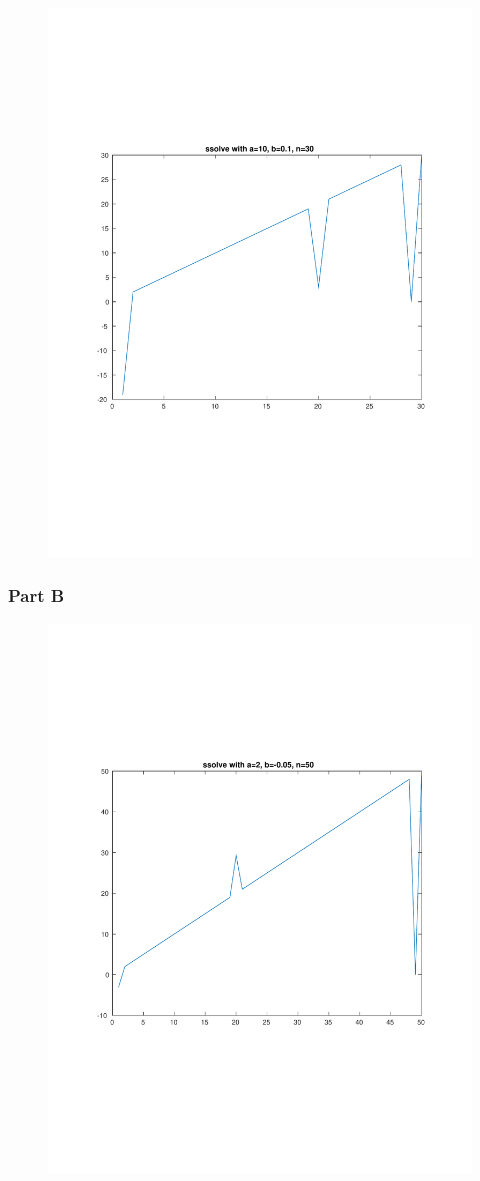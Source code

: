 \begin{figure}[h]
\centering
\includegraphics[trim = 20mm 20mm 20mm 20mm, clip, width=.8\textwidth]{figs/a0_q4_a.pdf}
\label{fig:a0_q4_a}
\end{figure}

\newpage
\subsubsection{Part B}

\begin{figure}[h]
\centering
\includegraphics[trim = 20mm 20mm 20mm 20mm, clip, width=.8\textwidth]{figs/a0_q4_b.pdf}
\label{fig:a0_q4_b}
\end{figure}
